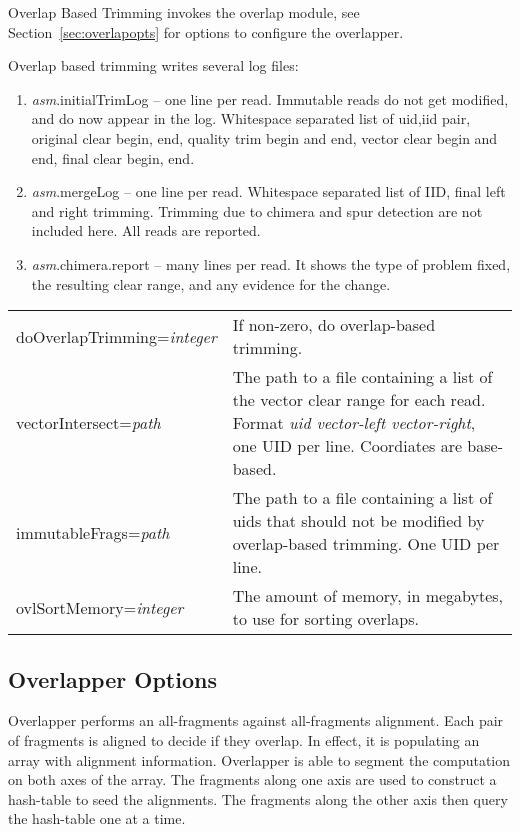 \documentclass[twoside,11pt]{article}
\begin{document}
Overlap Based Trimming invokes the overlap module, see
Section~\ref{sec:overlapopts} for options to configure the overlapper.

Overlap based trimming writes several log files:

\begin{enumerate}
\item {\it asm}.initialTrimLog -- one line per read.  Immutable reads do not
get modified, and do now appear in the log.  Whitespace separated list
of uid,iid pair, original clear begin, end, quality trim begin and
end, vector clear begin and end, final clear begin, end.

\item {\it asm}.mergeLog -- one line per read.  Whitespace separated list of
IID, final left and right trimming.  Trimming due to chimera and spur
detection are not included here.  All reads are reported.

\item {\it asm}.chimera.report -- many lines per read.  It shows the type of
problem fixed, the resulting clear range, and any evidence for the
change.
\end{enumerate}


\begin{tabular}{lp{4.0in}}
doOverlapTrimming={\it integer} &
If non-zero, do overlap-based trimming.
\\

vectorIntersect={\it path} &
The path to a file containing a list of the vector clear range for each read.
Format {\it uid vector-left vector-right}, one UID per line.  Coordiates are base-based.
\\

immutableFrags={\it path} &
The path to a file containing a list of uids that should not be modified
by overlap-based trimming.  One UID per line.
\\

ovlSortMemory={\it integer} &
The amount of memory, in megabytes, to use for sorting overlaps.
\\
\end{tabular}



\subsection{Overlapper Options}
\label{sec:overlapopt}

Overlapper performs an all-fragments against all-fragments alignment.
Each pair of fragments is aligned to decide if they overlap.  In
effect, it is populating an array with alignment information.
Overlapper is able to segment the computation on both axes of the
array.  The fragments along one axis are used to construct a
hash-table to seed the alignments.  The fragments along the other axis
then query the hash-table one at a time.
\end{document}
